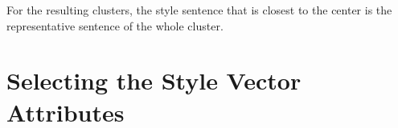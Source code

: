 For the resulting clusters, the style sentence that is closest to the center is the representative sentence of the whole cluster.




\section{Selecting the Style Vector Attributes}
\label{sec:approach:selection}

